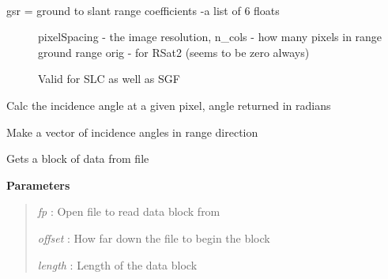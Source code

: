 \documentclass[letterpaper,10pt,openany,oneside]{sphinxmanual}
\begin{document}
\begin{fulllineitems}
\label{code:Metadata.getSlantRange}~\begin{description}
\item[{gsr = ground to slant range coefficients -a list of 6 floats}] \leavevmode
pixelSpacing - the image resolution, n\_cols - how many pixels in range
ground range orig - for RSat2 (seems to be zero always)

Valid for SLC as well as SGF

\end{description}

\end{fulllineitems}


\begin{fulllineitems}
\label{code:Metadata.getThetaPixel}
Calc the incidence angle at a given pixel, angle returned in radians

\end{fulllineitems}


\begin{fulllineitems}
\label{code:Metadata.getThetaVector}
Make a vector of incidence angles in range direction

\end{fulllineitems}


\begin{fulllineitems}
\label{code:Metadata.get_data_block}
Gets a block of data from file

\textbf{Parameters}
\begin{quote}

\emph{fp} : Open file to read data block from

\emph{offset} : How far down the file to begin the block

\emph{length} : Length of the data block
\end{quote}

\end{fulllineitems}
\end{document}
